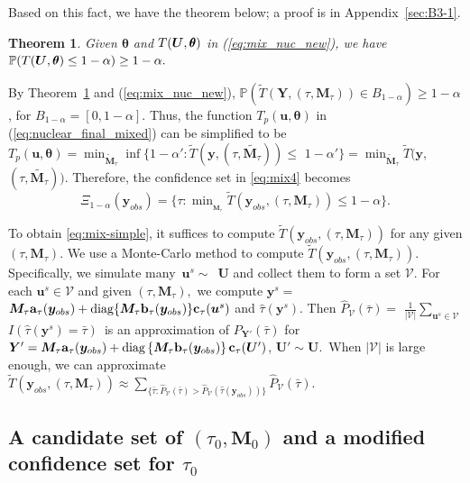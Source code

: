 \documentclass[12pt]{article}
\theoremstyle{shortspace}
\newtheorem{theorem}{Theorem}
\def\*#1{\bm{#1}}
\def\btheta{\mathop{\theta\kern-.45em\hbox{$\theta$}}\nolimits}
\def\P{\mathbb P}
\def\A{\mathbf a}
\def\B{\mathbf b}
\def\C{\mathbf c}
\newcommand{\diag}{\hbox{diag}}
\begin{document}
Based on this fact, we have the theorem below; a proof is in  Appendix~\ref{sec:B3-1}. 
\begin{theorem}
\label{the: nuc_new_unif} Given $\*\theta$ and $T(\*U, \btheta)$  in (\ref{eq:mix_nuc_new}), we have
$\P(T(\*U, \btheta) \leq 1-\alpha) \geq 1-\alpha.$
\end{theorem}
 By Theorem~\ref{the: nuc_new_unif} and (\ref{eq:mix_nuc_new}),
$\P(\widetilde T(\*Y, (\tau,{\*M_\tau})) \in B_{1 -\alpha}) \geq 1-\alpha$, for $B_{1 -\alpha} = [0, 1-\alpha].$
Thus,  the function
$T_p(\*u, \*\theta)$   
in (\ref{eq:nuclear_final_mixed}) can be simplified to be $T_p(\*u, \*\theta)  
    = \min_{\widetilde{\*M}_\tau}\inf\{1-\alpha': \widetilde T(\*y, (\tau,\widetilde{\*M_\tau})) \leq $ $1-\alpha'\}
    = \min_{\widetilde{\*M}_\tau}\widetilde T(\*y, $ $ (\tau,\widetilde{\*M_\tau})).
$
Therefore, the confidence set in \eqref{eq:mix4} becomes 
\begin{equation}
    \label{eq:mix-simple}
\Xi_{1-\alpha}(\*y_{obs}) 
 = \big\{\tau: \min\nolimits_{_{{\*M}_\tau}}\widetilde T(\*y_{obs}, (\tau,{\*M_\tau}))\leq 1-\alpha \big\}.
 \end{equation} 

To obtain \eqref{eq:mix-simple}, it 
 suffices to  compute $\widetilde T(\*y_{obs}, (\tau, {\*M_\tau}))$ for any given $(\tau, {\*M}_\tau)$.
  We use a Monte-Carlo method to compute $\widetilde T(\*y_{obs}, (\tau, {\*M_\tau}))$. Specifically, we simulate many~$\*u^s \sim$~$\*U$ and collect them to form a set $\mathcal V$. For each $\*u^s \in \mathcal V$ and given  $(\tau, {\*M}_\tau),$ we compute
$\*y^s = $ ${\*M}_\tau\A_{\tau}(\*y_{obs})+\diag\{{\*M}_\tau\B_{\tau}(\*y_{obs})\}\C_{\tau}(\*u^s)$
and $\hat\tau (\*y^s)$.  Then $\widehat P_{\mathcal V}(\bar \tau) = $ $\frac{1}{|\mathcal V|}\sum_{\*u^s \in \mathcal V}$ $I(\hat \tau(\*y^s) =\bar \tau)$~is an approximation of $P_{{\*Y}'}(\bar \tau)$ for 
{\small ${\*Y}' 
=  \*M_{\tau} \A_{\tau}(\*y_{obs}) + \diag\left\{\*M_\tau\B_{\tau}(\*y_{obs})\right\}\C_{\tau}({\*U'})$, ${\*U}' \sim \*U$}.~When $|\mathcal V|$ is large enough, we can approximate 
$
    \widetilde T(\*y_{obs}, (\tau, {\*M_\tau})) \approx \sum_{\{\bar \tau: \hat P_{\mathcal V}(\bar \tau) > \hat P_{\mathcal V}(\hat \tau(\*y_{obs})) \}}\hat P_{\mathcal V}(\bar \tau). 
$






\subsection{A candidate set of $(\tau_0,\*M_0)$ and a modified confidence set for $\tau_0$} \label{sec:finding_candidates}
\end{document}
